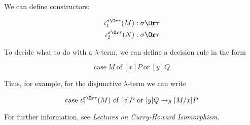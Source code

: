 \documentclass[11pt]{scrartcl}
\begin{document}
  We can define constructors:

  \begin{align}
    \iota_{1}^{\sigma \Or \tau}(M): \sigma \Or \tau\\
    \iota_{2}^{\sigma \Or \tau}(N): \sigma \Or \tau
  \end{align}

  To decide what to do with a $\lambda$-term, we can define a decision
  rule in the form
  
  \begin{equation*}
    \text{case}\ M\ \text{of}\ [x]P\ \text{or}\ [y]Q
  \end{equation*}

  Thus, for example, for the disjunctive $\lambda$-term we can write

  \begin{equation*}
    \text{case}\ \iota_{1}^{\sigma\Or \tau}(M)\ \text{of} \ [x]P\
    \text{or}\ [y]Q \to_{\beta} [M/x]P 
  \end{equation*}

  For further information, see \textit{Lectures on Curry-Howard
    Isomorphism}.
  
\end{document}
